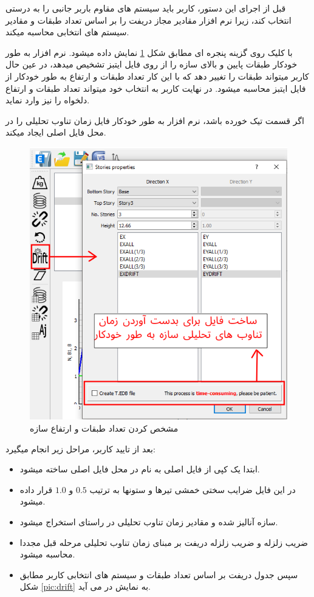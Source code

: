 قبل از اجرای این دستور، کاربر باید سیستم های مقاوم باربر جانبی را به درستی انتخاب کند، زیرا نرم افزار مقادیر مجاز دریفت را بر اساس تعداد طبقات و مقادیر 
سیستم های انتخابی محاسبه میکند.

با کلیک روی گزینه 
پنجره ای مطابق شکل \ref{pic:drift_dialog} نمایش داده میشود.
نرم افزار به طور خودکار طبقات پایین و بالای سازه را از روی فایل ایتبز تشخیص میدهد، در عین حال کاربر میتواند طبقات را تغییر دهد که با این کار تعداد طبقات و ارتفاع به طور خودکار از فایل ایتبز محاسبه میشود.
در نهایت کاربر به انتخاب خود میتواند تعداد طبقات و ارتفاع دلخواه را نیز وارد نماید.

اگر قسمت
تیک خورده باشد، نرم افزار به طور خودکار فایل زمان تناوب تحلیلی را در محل فایل اصلی ایجاد میکند.

\begin{figure}[H]
    \centering
    \includegraphics[scale=0.7]{figures/drift_dialog}
    \caption{مشخص کردن تعداد طبقات و ارتفاع سازه}
    \label{pic:drift_dialog}
\end{figure}

بعد از تایید کاربر، مراحل زیر انجام میگیرد:
\begin{itemize}
    \item ابتدا یک کپی از فایل اصلی به نام  در محل فایل اصلی ساخته میشود.
    \item در این فایل ضرایب سختی خمشی تیرها و ستونها به ترتیب $0.5$ و $1.0$ قرار داده میشود.
    \item سازه آنالیز شده و مقادیر زمان تناوب تحلیلی در راستای  استخراج میشود.
    \item ضریب زلزله و ضریب زلزله دریفت بر مبنای زمان تناوب تحلیلی مرحله قبل مجددا محاسبه میشود.
    \item سپس جدول دریفت بر اساس تعداد طبقات و سیستم های انتخابی کاربر مطابق شکل \ref{pic:drift} به نمایش در می آید.
\end{itemize}

